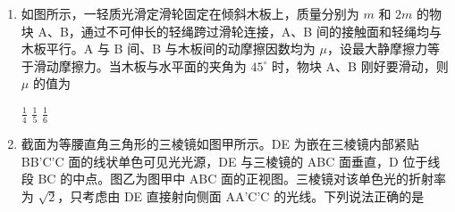\documentclass[\gkver]{gaokaozhenti}
\begin{document}
\begin{enumerate}
{着陆器做匀减速直线运动，根据运动学公式可知 $0=v_{0}-at_{0}$，解得 $a=\frac{v_{0}}{t_{0}}$。

匀减速过程，根据牛顿第二定律得 $f-mg_{\text{火}}=ma$，解得着陆器受到的制动力大小为 $f=mg_{\text{火}}+ma=m\left(0.4g+\frac{v_{0}}{t_{0}}\right)$。

ACD 错误，B 正确。

故选 B。
}

\item
如图所示，一轻质光滑定滑轮固定在倾斜木板上，质量分别为 $m$ 和 $2m$ 的物块 A、B，通过不可伸长的轻绳跨过滑轮连接，A、B 间的接触面和轻绳均与木板平行。A 与 B 间、B 与木板间的动摩擦因数均为 $\mu$，设最大静摩擦力等于滑动摩擦力。当木板与水平面的夹角为 $45^\circ$ 时，物块 A、B 刚好要滑动，则 $\mu$ 的值为


{$\frac{1}{4}$}
{$\frac{1}{5}$}
{$\frac{1}{6}$}


\item
截面为等腰直角三角形的三棱镜如图甲所示。DE 为嵌在三棱镜内部紧贴 BB'C'C 面的线状单色可见光光源，DE 与三棱镜的 ABC 面垂直，D 位于线段 BC 的中点。图乙为图甲中 ABC 面的正视图。三棱镜对该单色光的折射率为 $\sqrt{2}$，只考虑由 DE 直接射向侧面 AA'C'C 的光线。下列说法正确的是


\end{enumerate}
\end{document}
